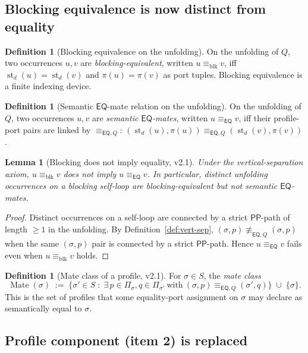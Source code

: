 \documentclass[11pt]{article}
\newtheorem{lemma}[theorem]{Lemma}
\theoremstyle{definition}
\newtheorem{definition}[theorem]{Definition}
\theoremstyle{remark}
\newcommand{\PP}{\mathsf{PP}}
\newcommand{\EQ}{\mathsf{EQ}}
\newcommand{\st}{\operatorname{st}}
\newcommand{\eqcong}{\equiv_{\EQ}}
\newcommand{\eqQ}{\equiv_{\EQ,Q}}
\newcommand{\blk}{\equiv_{\mathrm{blk}}}
\newcommand{\Mate}{\operatorname{Mate}}
\begin{document}
\subsection{Blocking equivalence is now distinct from equality}

\begin{definition}[Blocking equivalence on the
unfolding]\label{def:blk}
On the unfolding of $Q$, two occurrences $u,v$ are
\emph{blocking-equivalent}, written $u\blk v$, iff
$\st_d(u)=\st_d(v)$ and $\pi(u)=\pi(v)$ as port tuples.  Blocking
equivalence is a finite indexing device.
\end{definition}

\begin{definition}[Semantic $\EQ$-mate relation on the
unfolding]\label{def:eq-mate-unfold}
On the unfolding of $Q$, two occurrences $u,v$ are \emph{semantic
$\EQ$-mates}, written $u \eqcong v$, iff their profile-port pairs
are linked by $\eqQ$:
$(\st_d(u),\pi(u)) \eqQ (\st_d(v),\pi(v))$.
\end{definition}

\begin{lemma}[Blocking does not imply equality, v2.1]
\label{lem:blk-vs-eq}
Under the vertical-separation axiom, $u\blk v$ does \emph{not}
imply $u\eqcong v$.  In particular, distinct unfolding occurrences
on a blocking self-loop are blocking-equivalent but not semantic
$\EQ$-mates.
\end{lemma}

\begin{proof}
Distinct occurrences on a self-loop are connected by a strict
$\PP$-path of length $\ge 1$ in the unfolding.  By
Definition~\ref{def:vert-sep},
$(\sigma,p)\not\eqQ(\sigma,p)$ when the same $(\sigma,p)$ pair is
connected by a strict $\PP$-path.  Hence $u\eqcong v$ fails even
when $u\blk v$ holds.
\end{proof}

\begin{definition}[Mate class of a profile, v2.1]\label{def:mate}
For $\sigma\in S$, the \emph{mate class}
\[
\Mate(\sigma) \;:=\; \{\sigma'\in S \;:\; \exists\, p\in\Pi_\sigma,
   q\in\Pi_{\sigma'}\ \text{with}\ (\sigma,p)\eqQ(\sigma',q)\}
\;\cup\;\{\sigma\}.
\]
This is the set of profiles that some equality-port assignment on
$\sigma$ may declare as semantically equal to $\sigma$.
\end{definition}

\subsection{Profile component (item 2) is replaced}
\end{document}
